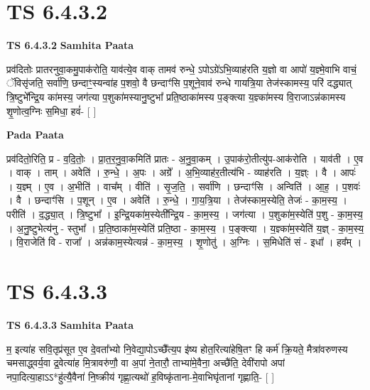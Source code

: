 \documentclass[17pt]{extarticle}
\begin{document}

\section{ TS 6.4.3.2 }

\textbf{TS 6.4.3.2 } \newline
\textbf{Samhita Paata} \newline

प्रव॑दितोः प्रातरनुवा॒कमु॒पाक॑रोति॒ याव॑त्ये॒व वाक् तामव॑ रुन्धे॒ ऽपोऽग्रे॑ऽभि॒व्याह॑रति य॒ज्ञो वा आपो॑ य॒ज्ञ्मे॒वाभि वाचं॒ ॅविसृ॑जति॒ सर्वा॑णि॒ छन्दाꣳ॒॒स्यन्वा॑ह प॒शवो॒ वै छन्दाꣳ॑सि प॒शूने॒वाव॑ रुन्धे गायत्रि॒या तेज॑स्कामस्य॒ परि॑ दद्ध्यात् त्रि॒ष्टुभे᳚न्द्रि॒य का॑मस्य॒ जग॑त्या प॒शुका॑मस्यानु॒ष्टुभा᳚ प्रति॒ष्ठाका॑मस्य प॒ङ्क्त्या य॒ज्ञ्का॑मस्य वि॒राजाऽन्न॑कामस्य शृ॒णोत्व॒ग्निः स॒मिधा॒ हवं॑- [  ] \newline

\textbf{Pada Paata} \newline

प्रव॑दितो॒रिति॒ प्र - व॒दि॒तोः॒ । प्रा॒त॒र॒नु॒वा॒कमिति॑ प्रातः - अ॒नु॒वा॒कम् । उ॒पाक॑रो॒तीत्यु॑प-आक॑रोति । याव॑ती । ए॒व । वाक् । ताम् । अवेति॑ । रु॒न्धे॒ । अ॒पः । अग्रे᳚ । अ॒भि॒व्याह॑र॒तीत्य॑भि - व्याह॑रति । य॒ज्ञ्ः । वै । आपः॑ । य॒ज्ञ्म् । ए॒व । अ॒भीति॑ । वाच᳚म् । वीति॑ । सृ॒ज॒ति॒ । सर्वा॑णि । छन्दाꣳ॑सि । अन्विति॑ । आ॒ह॒ । प॒शवः॑ । वै । छन्दाꣳ॑सि । प॒शून् । ए॒व । अवेति॑ । रु॒न्धे॒ । गा॒य॒त्रि॒या । तेज॑स्काम॒स्येति॒ तेजः॑ - का॒म॒स्य॒ । परीति॑ । द॒द्ध्या॒त् । त्रि॒ष्टुभा᳚ । इ॒न्द्रि॒यका॑म॒स्येती᳚न्द्रि॒य - का॒म॒स्य॒ । जग॑त्या । प॒शुका॑म॒स्येति॑ प॒शु - का॒म॒स्य॒ । अ॒नु॒ष्टुभेत्य॑नु - स्तुभा᳚ । प्र॒ति॒ष्ठाका॑म॒स्येति॑ प्रति॒ष्ठा - का॒म॒स्य॒ । प॒ङ्क्त्या । य॒ज्ञ्का॑म॒स्येति॑ य॒ज्ञ् - का॒म॒स्य॒ । वि॒राजेति॑ वि - राजा᳚ । अन्न॑काम॒स्येत्यन्न॑ - का॒म॒स्य॒ । शृ॒णोतु॑ । अ॒ग्निः । स॒मिधेति॑ सं - इधा᳚ । हव᳚म् ।  \newline





\section{ TS 6.4.3.3 }

\textbf{TS 6.4.3.3 } \newline
\textbf{Samhita Paata} \newline

म॒ इत्या॑ह सवि॒तृप्र॑सूत ए॒व दे॒वता᳚भ्यो नि॒वेद्या॒पोऽच्छै᳚त्य॒प इ॑ष्य होत॒रित्या॑हेषि॒तꣳ हि कर्म॑ क्रि॒यते॒ मैत्रा॑वरुणस्य चमसाद्ध्वर्य॒वा द्र॒वेत्या॑ह मि॒त्रावरु॑णौ॒ वा अ॒पां ने॒तारौ॒ ताभ्या॑मे॒वैना॒ अच्छै॑ति॒ देवी॑रापो अपां नपा॒दित्या॒हाऽऽ*हु॑त्यै॒वैना॑ नि॒ष्क्रीय॑ गृह्णा॒त्यथो॑ ह॒विष्कृ॑ताना-मे॒वाभिघृ॑तानां गृह्णाति॒- [  ] \newline
\end{document}

